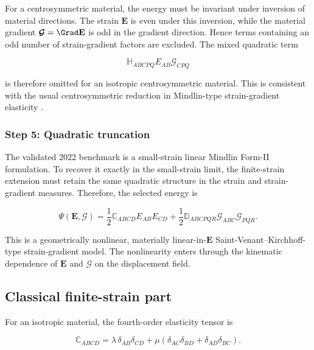 \documentclass[11pt]{article}
\begin{document}
For a centrosymmetric material, the energy must be invariant under inversion of material directions. The strain $\mathbf{E}$ is even under this inversion, while the material gradient $\bm{\mathcal{G}}=\Grad\mathbf{E}$ is odd in the gradient direction. Hence terms containing an odd number of strain-gradient factors are excluded. The mixed quadratic term

\begin{equation}
\mathbb{H}_{ABCPQ}E_{AB}\mathcal{G}_{CPQ}
\label{eq:sec2_mixed_coupling}
\end{equation}

is therefore omitted for an isotropic centrosymmetric material. This is consistent with the usual centrosymmetric reduction in Mindlin-type strain-gradient elasticity \cite{Mindlin1964,MindlinEshel1968,LazarPo2018}.

\subsubsection{Step 5: Quadratic truncation}

The validated 2022 benchmark is a small-strain linear Mindlin Form-II formulation. To recover it exactly in the small-strain limit, the finite-strain extension must retain the same quadratic structure in the strain and strain-gradient measures. Therefore, the selected energy is

\begin{equation}
\boxed{
\Psi(\mathbf{E},\bm{\mathcal{G}})
=
\frac{1}{2}\mathbb{C}_{ABCD}E_{AB}E_{CD}
+
\frac{1}{2}\mathbb{D}_{ABCPQR}\mathcal{G}_{ABC}\mathcal{G}_{PQR}.
}
\label{eq:sec2_selected_tensor_energy}
\end{equation}

This is a geometrically nonlinear, materially linear-in-$\mathbf{E}$ Saint-Venant--Kirchhoff-type strain-gradient model. The nonlinearity enters through the kinematic dependence of $\mathbf{E}$ and $\bm{\mathcal{G}}$ on the displacement field.

\subsection{Classical finite-strain part}

For an isotropic material, the fourth-order elasticity tensor is

\begin{equation}
\mathbb{C}_{ABCD}
=
\lambda\,\delta_{AB}\delta_{CD}
+
\mu\left(
\delta_{AC}\delta_{BD}
+
\delta_{AD}\delta_{BC}
\right).
\label{eq:sec2_isotropic_C_tensor}
\end{equation}
\end{document}
